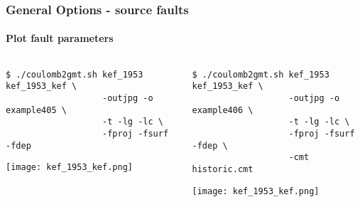 \begin{frame}[t,fragile]
  \frametitle{General Options - source faults}
  \framesubtitle{Plot fault parameters}
  \label{fr4:hist_pics}
\begin{columns}[t]
  \begin{column}{.5\textwidth}
\begin{scriptsize}
\begin{verbatim}
$ ./coulomb2gmt.sh kef_1953 kef_1953_kef \
                   -outjpg -o example405 \
                   -t -lg -lc \
                   -fproj -fsurf -fdep
\end{verbatim}
\end{scriptsize}
\centering
\texttt{[image: kef\_1953\_kef.png]}
  \end{column}
  \begin{column}{.5\textwidth}
  \begin{scriptsize}
\begin{verbatim}
$ ./coulomb2gmt.sh kef_1953 kef_1953_kef \
                   -outjpg -o example406 \
                   -t -lg -lc \
                   -fproj -fsurf -fdep \
                   -cmt historic.cmt
\end{verbatim}
\end{scriptsize}
\centering
  \texttt{[image: kef\_1953\_kef.png]}
  \end{column}
\end{columns}

\end{frame}
\note{}

